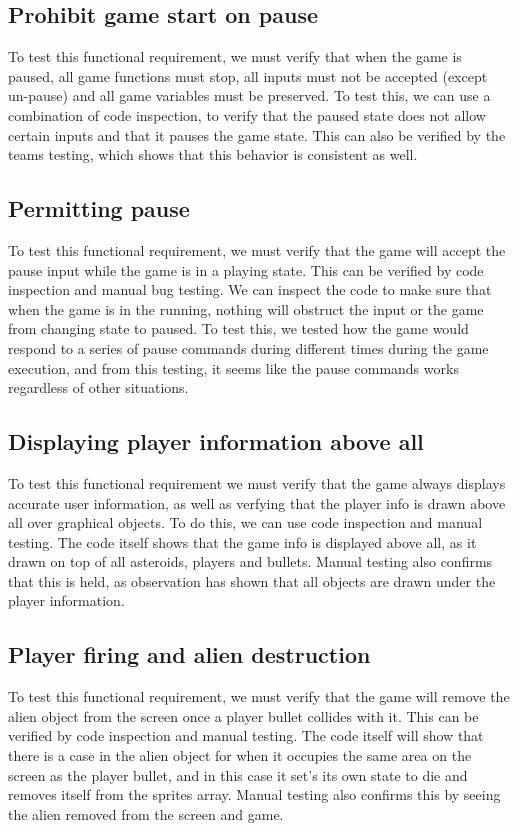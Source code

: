\documentclass[12pt, titlepage]{article}
\begin{document}
\subsection{Prohibit game start on pause}
To test this functional requirement, we must verify that when the game is paused,
all game functions must stop, all inputs must not be accepted (except un-pause)
and all game variables must be preserved.
To test this, we can use a combination of code inspection,
to verify that the paused state does not allow certain inputs and that it pauses the game state.
This can also be verified by the teams testing, which shows that this behavior is consistent as well.
\subsection{Permitting pause}
To test this functional requirement, we must verify that the game will accept the pause input
while the game is in a playing state.
This can be verified by code inspection and manual bug testing.
We can inspect the code to make sure that when the game is in the running,
nothing will obstruct the input or the game from changing state to paused.
To test this, we tested how the game would respond to a series of pause commands during
different times during the game execution, and from this testing,
it seems like the pause commands works regardless of other situations.
\subsection{Displaying player information above all}
To test this functional requirement we must verify that the game always displays accurate user information, as well as verfying that the player info is drawn above all over graphical objects. To do this, we can use code inspection and manual testing. The code itself shows that the game info is displayed above all, as it drawn on top of all asteroids, players and bullets. Manual testing also confirms that this is held, as observation has shown that all objects are drawn under the player information.
\subsection{Player firing and alien destruction}
To test this functional requirement, we must verify that the game will remove the alien object from the screen once a player bullet collides with it. This can be verified by code inspection and manual testing. The code itself will show that there is a case in the alien object for when it occupies the same area on the screen as the player bullet, and in this case it set's its own state to die and removes itself from the sprites array. Manual testing also confirms this by seeing the alien removed from the screen and game. \\
\end{document}
